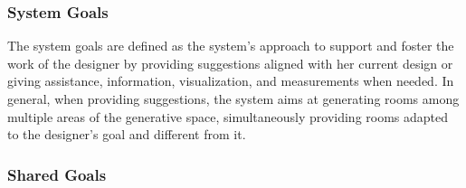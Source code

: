 

\subsubsection{System Goals}

The system goals are defined as the system's approach to support and foster the work of the designer by providing suggestions aligned with her current design or giving assistance, information, visualization, and measurements when needed. In general, when providing suggestions, the system aims at generating rooms among multiple areas of the generative space, simultaneously providing rooms adapted to the designer's goal and different from it. 


\subsubsection{Shared Goals}

